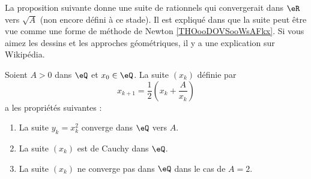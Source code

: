 La proposition suivante donne une suite de rationnels qui convergerait dans \( \eR\) vers \( \sqrt{ A }\) (non encore défini à ce stade). Il est expliqué dans \cite{BIBooMPXEooQLKhku} que la suite peut être vue comme une forme de méthode de Newton \ref{THOooDOVSooWsAFkx}. Si vous aimez les dessins et les approches géométriques, il y a une explication sur Wikipédia\cite{BIBooVCWCooQcolIq}.
\begin{proposition}       \label{PROPooSTQXooHlIGVf}
    Soient \( A>0\) dans \( \eQ\) et \( x_0\in \eQ\). La suite \( (x_k)\) définie par
    \begin{equation}
        x_{k+1}=\frac{ 1 }{2}\left( x_k+\frac{ A }{ x_k } \right)
    \end{equation}
    a les propriétés suivantes :
    \begin{enumerate}
        \item
            La suite \( y_k=x_k^2 \) converge dans \( \eQ\) vers \( A\).
        \item
            La suite \( (x_k)\) est de Cauchy dans \( \eQ\).
        \item
            La suite \( (x_k)\) ne converge pas dans \( \eQ\) dans le cas de \( A=2\).
    \end{enumerate}
\end{proposition}

